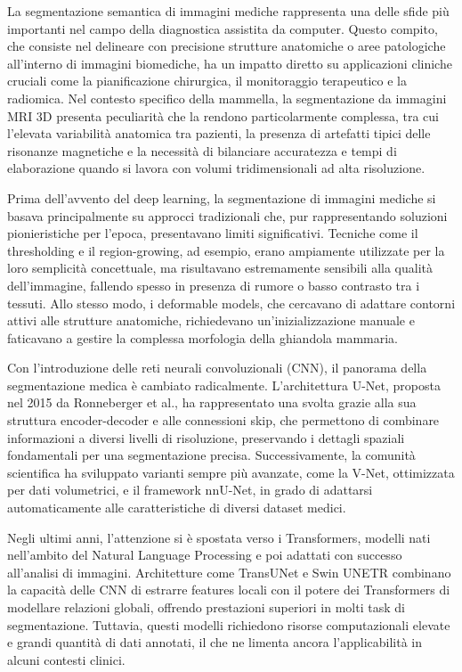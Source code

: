 

La segmentazione semantica di immagini mediche rappresenta una delle sfide più importanti nel campo della diagnostica assistita da computer. Questo compito, che consiste nel delineare con precisione strutture anatomiche o aree patologiche all’interno di immagini biomediche, ha un impatto diretto su applicazioni cliniche cruciali come la pianificazione chirurgica, il monitoraggio terapeutico e la radiomica. Nel contesto specifico della mammella, la segmentazione da immagini MRI 3D presenta peculiarità che la rendono particolarmente complessa, tra cui l’elevata variabilità anatomica tra pazienti, la presenza di artefatti tipici delle risonanze magnetiche e la necessità di bilanciare accuratezza e tempi di elaborazione quando si lavora con volumi tridimensionali ad alta risoluzione.


Prima dell’avvento del deep learning, la segmentazione di immagini mediche si basava principalmente su approcci tradizionali che, pur rappresentando soluzioni pionieristiche per l’epoca, presentavano limiti significativi. Tecniche come il thresholding e il region-growing, ad esempio, erano ampiamente utilizzate per la loro semplicità concettuale, ma risultavano estremamente sensibili alla qualità dell’immagine, fallendo spesso in presenza di rumore o basso contrasto tra i tessuti. Allo stesso modo, i deformable models, che cercavano di adattare contorni attivi alle strutture anatomiche, richiedevano un’inizializzazione manuale e faticavano a gestire la complessa morfologia della ghiandola mammaria.

Con l’introduzione delle reti neurali convoluzionali (CNN), il panorama della segmentazione medica è cambiato radicalmente. L’architettura U-Net, proposta nel 2015 da Ronneberger et al., ha rappresentato una svolta grazie alla sua struttura encoder-decoder e alle connessioni skip, che permettono di combinare informazioni a diversi livelli di risoluzione, preservando i dettagli spaziali fondamentali per una segmentazione precisa. Successivamente, la comunità scientifica ha sviluppato varianti sempre più avanzate, come la V-Net, ottimizzata per dati volumetrici, e il framework nnU-Net, in grado di adattarsi automaticamente alle caratteristiche di diversi dataset medici.

Negli ultimi anni, l’attenzione si è spostata verso i Transformers, modelli nati nell’ambito del Natural Language Processing e poi adattati con successo all’analisi di immagini. Architetture come TransUNet e Swin UNETR combinano la capacità delle CNN di estrarre features locali con il potere dei Transformers di modellare relazioni globali, offrendo prestazioni superiori in molti task di segmentazione. Tuttavia, questi modelli richiedono risorse computazionali elevate e grandi quantità di dati annotati, il che ne limenta ancora l’applicabilità in alcuni contesti clinici.



